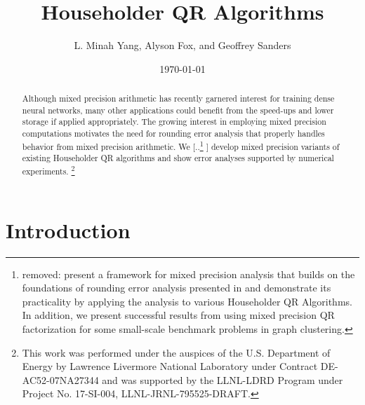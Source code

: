 \documentclass[review,onefignum,onetabnum]{siamart190516}
\title{\DIFdelbegin \DIFdel{Mixed-Precision analysis of }\DIFdelend \DIFaddbegin \DIFadd{Rounding Error Analysis of Mixed Precision Block }\DIFaddend Householder QR Algorithms}
\author{L. Minah Yang, Alyson Fox, and Geoffrey Sanders}
\date{\today}
\newcommand\blfootnote[1]{%
	\begingroup
	\renewcommand\thefootnote{}\footnote{#1}%
	\addtocounter{footnote}{-1}%
	\endgroup
}
\providecommand{\DIFadd}[1]{{\protect\color{blue} \sf #1}} %
\providecommand{\DIFdel}[1]{{\protect\color{red} [..\footnote{removed: #1} ]}} %
\providecommand{\DIFaddbegin}{} %
\providecommand{\DIFaddend}{} %
\providecommand{\DIFdelbegin}{} %
\providecommand{\DIFdelend}{} %
\begin{document}
\maketitle
\begin{abstract}
	Although mixed precision arithmetic has recently garnered interest for training dense neural networks, many other applications could benefit from the  speed-ups and lower storage if applied appropriately. 
	The growing interest in employing mixed precision computations motivates the need for rounding error analysis that properly handles behavior from mixed precision arithmetic.
	We \DIFdelbegin \DIFdel{present a framework for mixed precision analysis that builds on the foundations of rounding error analysis presented in \cite{Higham2002} and demonstrate its practicality by applying the analysis to various Householder QR Algorithms.
	In addition, we present successful results from using mixed precision QR factorization for some small-scale benchmark problems in graph clustering. 
	}\DIFdelend \DIFaddbegin \DIFadd{develop mixed precision variants of existing Householder QR algorithms and show error analyses supported by numerical experiments.
	}\DIFaddend \blfootnote{This work was performed under the auspices of the U.S. Department of Energy by Lawrence Livermore National Laboratory under Contract DE-AC52-07NA27344 and was supported by the LLNL-LDRD Program under Project No. 17-SI-004, LLNL-JRNL-795525-DRAFT.}
\end{abstract}
\section{Introduction}\label{sec:intro}
\DIFaddbegin 
\end{document}
